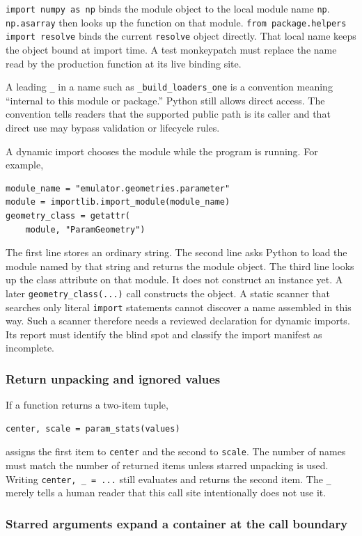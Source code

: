 \documentclass[10pt,aps,prd,twocolumn,nofootinbib]{revtex4-2}
\newcommand{\code}[1]{\texttt{#1}}
\begin{document}
\code{import numpy as np} binds the module object to the local module name
\code{np}.  \code{np.asarray} then looks up the function on that module.
\code{from package.helpers import resolve} binds the current
\code{resolve} object directly.  That local name keeps the object bound at
import time.  A test monkeypatch must replace the name read by the production
function at its live binding site.

A leading \code{\_} in a name such as \code{\_build\_loaders\_one} is a
convention meaning ``internal to this module or package.''  Python still
allows direct access.  The convention tells readers that the
supported public path is its caller and that direct use may bypass validation
or lifecycle rules.

A dynamic import chooses the module while the program is running.  For
example,
\begin{verbatim}
module_name = "emulator.geometries.parameter"
module = importlib.import_module(module_name)
geometry_class = getattr(
    module, "ParamGeometry")
\end{verbatim}
The first line stores an ordinary string.  The second line asks Python to load
the module named by that string and returns the module object.  The third line
looks up the class attribute on that module.  It does not construct an instance
yet.  A later \code{geometry\_class(...)} call constructs the object.  A static
scanner that searches only literal \code{import} statements cannot discover a
name assembled in this way.  Such a scanner therefore needs a reviewed
declaration for dynamic imports.  Its report must identify the blind spot and
classify the import manifest as incomplete.

\subsubsection{Return unpacking and ignored values}

If a function returns a two-item tuple,
\begin{verbatim}
center, scale = param_stats(values)
\end{verbatim}
assigns the first item to \code{center} and the second to \code{scale}.  The
number of names must match the number of returned items unless starred
unpacking is used.  Writing \code{center, \_ = ...} still evaluates and
returns the second item.  The \code{\_} merely tells a human reader that this
call site intentionally does not use it.

\subsubsection{Starred arguments expand a container at the call boundary}
\end{document}

